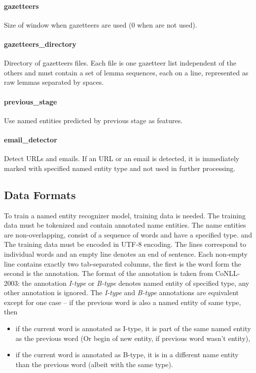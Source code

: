 \paragraph{gazetteers}
Size of window when gazetteers are used (0 when are not used).

\paragraph{gazetteers\_directory}
Directory of gazetteers files. Each file is one gazetteer list independent
of the others and must contain a set of lemma sequences, each on a line,
represented as raw lemmas separated by spaces.

\paragraph{previous\_stage}
Use named entities predicted by previous stage as features.

\paragraph{email\_detector}
Detect URLs and emails. If an URL or an email is detected, it is immediately marked
with specified named entity type and not used in further processing.

\subsection{Data Formats}
To train a named entity recognizer model, training data is needed. The training data must be tokenized and contain annotated name entities. The name entities are non-overlapping, consist of a sequence of words and have a specified type.
and
The training data must be encoded in UTF-8 encoding. The lines correspond to individual words and an empty line denotes an end of sentence. Each non-empty line contains exactly two tab-separated columns, the first is the word form the second is the annotation. The format of the annotation is taken from CoNLL-2003: the annotation {\it I-type} or {\it B-type} denotes named entity of specified type, any other annotation is ignored. The {\it I-type} and {\it B-type} annotations are equivalent except for one case – if the previous word is also a named entity of same type, then
\begin{itemize}
\item{}if the current word is annotated as I-type, it is part of the same named entity as the previous word (Or begin of new entity, if previous word wasn't entity),
\item{}if the current word is annotated as B-type, it is in a different name entity than the previous word (albeit with the same type).
\end{itemize}
